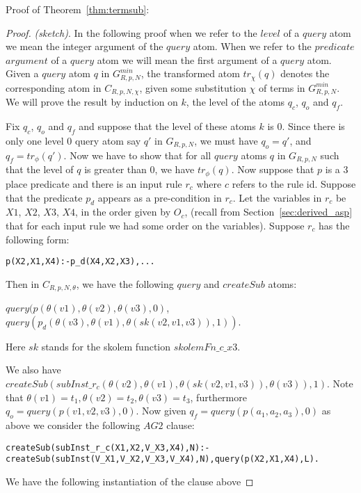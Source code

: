 Proof of Theorem~\ref{thm:termsub}:


\begin{proof} \textit{(sketch)}. In the following proof when we refer to the $level$ of a $query$ atom we mean the integer argument of the $query$ atom. When we refer to the $predicate$ $argument$ of a $query$ atom we will mean the first argument of a $query$ atom. Given a $query$ atom $q$ in $G_{R,p,N}^{min}$, the transformed atom $tr_{\chi}(q)$ denotes the corresponding atom in $C_{R,p,N,\chi}$, given some substitution $\chi$ of terms in $G_{R,p,N}^{min}$. We will prove the result by induction on $k$, the level of the atoms $q_{c}$, $q_{o}$ and $q_{f}$. 

Fix $q_{c}$, $q_{o}$ and $q_{f}$ and suppose that the level of these atoms $k$ is $0$. Since there is only one level $0$ query atom say $q'$ in $G_{R,p,N}$, we must have $q_{o}=q'$, and $q_{f} = tr_{\phi}(q')$. Now we have to show that for all $query$ atoms $q$ in $G_{R,p,N}$ such that the level of $q$ is greater than $0$, we have $tr_{\phi}(q)$. Now suppose that $p$ is a 3 place predicate and there is an input rule $r_{c}$ where ${c}$ refers to the rule id. Suppose that the predicate $p_{d}$ appears as a pre-condition in $r_{c}$. Let the variables in $r_{c}$ be $X1$, $X2$, $X3$, $X4$, in the order given by $O_{c}$, (recall from Section~\ref{sec:derived_asp} that for each input rule we had some order on the variables). Suppose $r_{c}$ has the following form:
\begin{verbatim}
p(X2,X1,X4):-p_d(X4,X2,X3),...    
\end{verbatim}

Then in $C_{R,p,N,\theta}$, we have the following $query$ and $createSub$ atoms:

$query(p(\theta(v1),\theta(v2),\theta(v3),0)$,\\ $query(p_{d}(\theta(v3),\theta(v1),\theta(sk(v2,v1,v3)),1))$. 

Here $sk$ stands for the skolem function $skolemFn\_c\_x3$. 

We also have\\
$createSub(subInst\_r_{c}(\theta(v2),\theta(v1),\theta(sk(v2,v1,v3)), \theta(v3)),1)$. Note that $\theta(v1)=t_{1},\theta(v2)=t_{2},\theta(v3)=t_{3}$, furthermore\\ $q_{o}= query(p(v1,v2,v3),0)$. Now given $q_{f} = query(p(a_{1},a_{2},a_{3}),0)$ as above we consider the following $AG2$ clause:
\begin{lstlisting}[frame=none]
createSub(subInst_r_c(X1,X2,V_X3,X4),N):-
createSub(subInst(V_X1,V_X2,V_X3,V_X4),N),query(p(X2,X1,X4),L).    
\end{lstlisting}
We have the following instantiation of the clause above


\end{proof}
